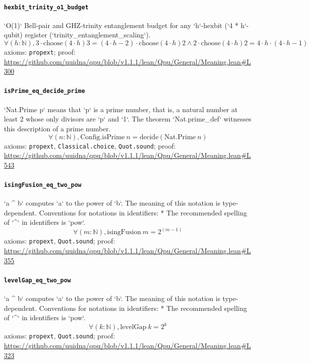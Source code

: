 \documentclass[11pt]{article}
\begin{document}
\paragraph{\texttt{hexbit\_trinity\_o1\_budget}}
`O(1)` Bell-pair and GHZ-trinity entanglement budget for any `h`-hexbit (`4 * h`-qubit) register (`trinity\_entanglement\_scaling`).
\[ \forall (h : \mathbb{N}), 3 \cdot \mathrm{choose} (4 \cdot h) 3 = (4 \cdot h - 2) \cdot \mathrm{choose} (4 \cdot h) 2 \land 2 \cdot \mathrm{choose} (4 \cdot h) 2 = 4 \cdot h \cdot (4 \cdot h - 1) \]
\noindent axioms: \texttt{propext}; proof: \url{https://github.com/uuidna/qpu/blob/v1.1.1/lean/Qpu/General/Meaning.lean\#L300}

\paragraph{\texttt{isPrime\_eq\_decide\_prime}}
`Nat.Prime p` means that `p` is a prime number, that is, a natural number at least 2 whose only divisors are `p` and `1`. The theorem `Nat.prime\_def` witnesses this description of a prime number.
\[ \forall (n : \mathbb{N}), \mathrm{Config.isPrime}\ n = \mathrm{decide} (\mathrm{Nat.Prime}\ n) \]
\noindent axioms: \texttt{propext}, \texttt{Classical.choice}, \texttt{Quot.sound}; proof: \url{https://github.com/uuidna/qpu/blob/v1.1.1/lean/Qpu/General/Meaning.lean\#L543}

\paragraph{\texttt{isingFusion\_eq\_two\_pow}}
`a \^{} b` computes `a` to the power of `b`. The meaning of this notation is type-dependent.   Conventions for notations in identifiers:   * The recommended spelling of `\^{}` in identifiers is `pow`.
\[ \forall (m : \mathbb{N}), \mathrm{isingFusion}\ m = 2 ^{(m - 1)} \]
\noindent axioms: \texttt{propext}, \texttt{Quot.sound}; proof: \url{https://github.com/uuidna/qpu/blob/v1.1.1/lean/Qpu/General/Meaning.lean\#L355}

\paragraph{\texttt{levelGap\_eq\_two\_pow}}
`a \^{} b` computes `a` to the power of `b`. The meaning of this notation is type-dependent.   Conventions for notations in identifiers:   * The recommended spelling of `\^{}` in identifiers is `pow`.
\[ \forall (k : \mathbb{N}), \mathrm{levelGap}\ k = 2 ^{k} \]
\noindent axioms: \texttt{propext}, \texttt{Quot.sound}; proof: \url{https://github.com/uuidna/qpu/blob/v1.1.1/lean/Qpu/General/Meaning.lean\#L323}
\end{document}
